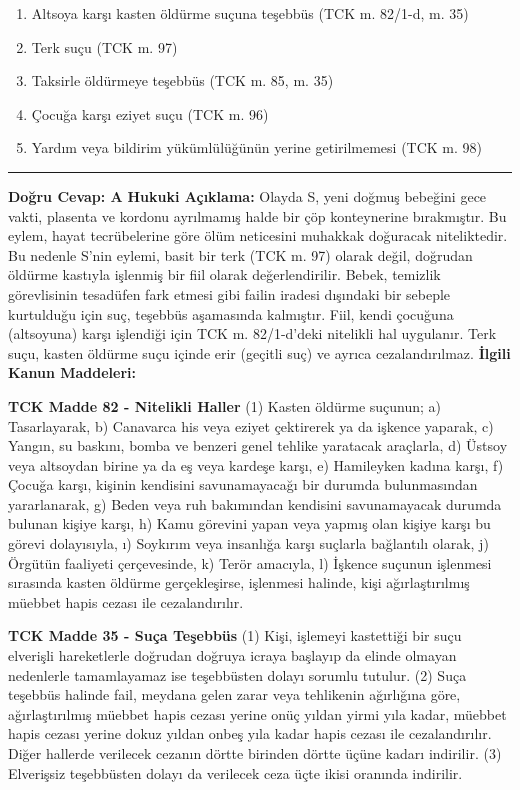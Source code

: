 \documentclass[a4paper, 11pt, twocolumn]{article}
\newenvironment{lawbox}{%
    \par\noindent
    \begin{tcolorbox}[
        colback=lawbg,
        colframe=boxcolor,
        fonttitle=\bfseries,
        boxrule=0.5pt,
        left=3pt,
        right=3pt,
        top=3pt,
        bottom=3pt,
        width=\columnwidth,
        arc=2pt,
        before skip=0.2cm,
        after skip=0.2cm
    ]
    \footnotesize\itshape
}{\end{tcolorbox}}
\begin{document}
\begin{enumerate}[label=\Alph*)]
    \item Altsoya karşı kasten öldürme suçuna teşebbüs (TCK m. 82/1-d, m. 35)
    \item Terk suçu (TCK m. 97)
    \item Taksirle öldürmeye teşebbüs (TCK m. 85, m. 35)
    \item Çocuğa karşı eziyet suçu (TCK m. 96)
    \item Yardım veya bildirim yükümlülüğünün yerine getirilmemesi (TCK m. 98)
\end{enumerate}
\hrule
\vspace{0.3cm}
\textbf{Doğru Cevap: A}
\newline
\textbf{Hukuki Açıklama:} Olayda S, yeni doğmuş bebeğini gece vakti, plasenta ve kordonu ayrılmamış halde bir çöp konteynerine bırakmıştır. Bu eylem, hayat tecrübelerine göre ölüm neticesini muhakkak doğuracak niteliktedir. Bu nedenle S'nin eylemi, basit bir terk (TCK m. 97) olarak değil, doğrudan öldürme kastıyla işlenmiş bir fiil olarak değerlendirilir. Bebek, temizlik görevlisinin tesadüfen fark etmesi gibi failin iradesi dışındaki bir sebeple kurtulduğu için suç, teşebbüs aşamasında kalmıştır. Fiil, kendi çocuğuna (altsoyuna) karşı işlendiği için TCK m. 82/1-d'deki nitelikli hal uygulanır. Terk suçu, kasten öldürme suçu içinde erir (geçitli suç) ve ayrıca cezalandırılmaz.
\textbf{İlgili Kanun Maddeleri:}
\begin{lawbox}
\textbf{TCK Madde 82 - Nitelikli Haller}
\newline
(1) Kasten öldürme suçunun;
a) Tasarlayarak,
b) Canavarca his veya eziyet çektirerek ya da işkence yaparak,
c) Yangın, su baskını, bomba ve benzeri genel tehlike yaratacak araçlarla,
d) Üstsoy veya altsoydan birine ya da eş veya kardeşe karşı,
e) Hamileyken kadına karşı,
f) Çocuğa karşı, kişinin kendisini savunamayacağı bir durumda bulunmasından yararlanarak,
g) Beden veya ruh bakımından kendisini savunamayacak durumda bulunan kişiye karşı,
h) Kamu görevini yapan veya yapmış olan kişiye karşı bu görevi dolayısıyla,
ı) Soykırım veya insanlığa karşı suçlarla bağlantılı olarak,
j) Örgütün faaliyeti çerçevesinde,
k) Terör amacıyla,
l) İşkence suçunun işlenmesi sırasında kasten öldürme gerçekleşirse,
işlenmesi halinde, kişi ağırlaştırılmış müebbet hapis cezası ile cezalandırılır.
\end{lawbox}
\begin{lawbox}
\textbf{TCK Madde 35 - Suça Teşebbüs}
\newline
(1) Kişi, işlemeyi kastettiği bir suçu elverişli hareketlerle doğrudan doğruya icraya başlayıp da elinde olmayan nedenlerle tamamlayamaz ise teşebbüsten dolayı sorumlu tutulur.
\newline
(2) Suça teşebbüs halinde fail, meydana gelen zarar veya tehlikenin ağırlığına göre, ağırlaştırılmış müebbet hapis cezası yerine onüç yıldan yirmi yıla kadar, müebbet hapis cezası yerine dokuz yıldan onbeş yıla kadar hapis cezası ile cezalandırılır. Diğer hallerde verilecek cezanın dörtte birinden dörtte üçüne kadarı indirilir.
\newline
(3) Elverişsiz teşebbüsten dolayı da verilecek ceza üçte ikisi oranında indirilir.
\end{lawbox}
\end{document}
